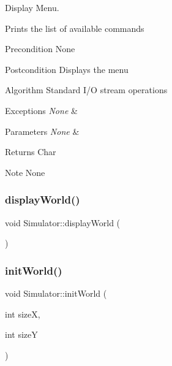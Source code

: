 Display Menu. 

Prints the list of available commands

\begin{DoxyPrecond}{Precondition}
None
\end{DoxyPrecond}
\begin{DoxyPostcond}{Postcondition}
Displays the menu
\end{DoxyPostcond}
\begin{DoxyParagraph}{Algorithm}
Standard I/O stream operations
\end{DoxyParagraph}

\begin{DoxyExceptions}{Exceptions}
{\em None} & \\
\hline
\end{DoxyExceptions}

\begin{DoxyParams}{Parameters}
{\em None} & \\
\hline
\end{DoxyParams}
\begin{DoxyReturn}{Returns}
Char
\end{DoxyReturn}
\begin{DoxyNote}{Note}
None 
\end{DoxyNote}
\hypertarget{class_simulator_a4bdab90628ce0acf61f27f351665ff52}{}\label{class_simulator_a4bdab90628ce0acf61f27f351665ff52} 
\subsubsection{\texorpdfstring{display\+World()}{displayWorld()}}
{\footnotesize\ttfamily void Simulator\+::display\+World (\begin{DoxyParamCaption}{ }\end{DoxyParamCaption})}

\hypertarget{class_simulator_a4eab2fe9f882b52f06d3635bb7b7ce76}{}\label{class_simulator_a4eab2fe9f882b52f06d3635bb7b7ce76} 
\subsubsection{\texorpdfstring{init\+World()}{initWorld()}}
{\footnotesize\ttfamily void Simulator\+::init\+World (\begin{DoxyParamCaption}\item[{int}]{sizeX,  }\item[{int}]{sizeY }\end{DoxyParamCaption})}



